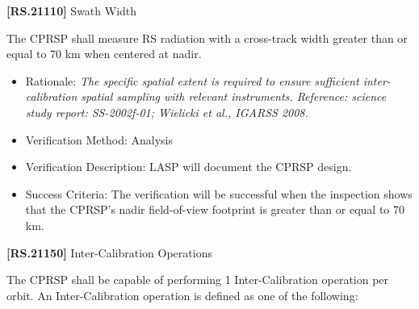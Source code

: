\documentclass[12pt,oneside,oldfontcommands]{memoir}
\begin{document}
\textbf{[RS.21110]} Swath Width

The \gls{CPRSP} shall \gls{measure} \gls{RS} radiation with a cross-track width greater than or equal to 70 km when centered at nadir.

\begin{itemize}
\item{} Rationale: \emph{The specific spatial extent is required to ensure sufficient inter-calibration spatial sampling with relevant instruments. Reference: science study report: SS-2002f-01; Wielicki et al., IGARSS 2008.}

\item{} Verification Method: Analysis

\item{} Verification Description: \gls{LASP} will document the \gls{CPRSP} design.

\item{} Success Criteria: The verification will be successful when the \gls{inspection} shows that the \gls{CPRSP}'s nadir field-of-view footprint is greater than or equal to 70 km.

\end{itemize}

\textbf{[RS.21150]} Inter-Calibration Operations

The \gls{CPRSP} shall be capable of performing 1 Inter-Calibration operation per orbit. An Inter-Calibration operation is defined as one of the following:
\end{document}
